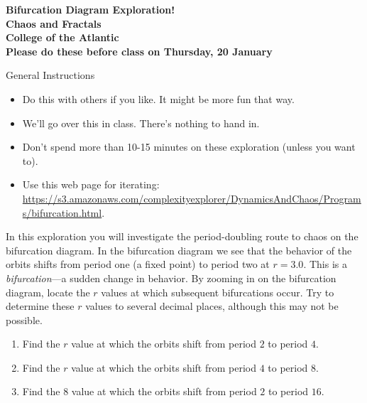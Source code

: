 \documentclass[12pt]{article}
\begin{document}
\pagestyle{empty}
 
\begin{center}
{\LARGE {\bf Bifurcation Diagram Exploration!}}\\
\bigskip
{\Large {\bf Chaos and Fractals}}\\
\bigskip
{\Large {\bf College of the Atlantic}}\\
\bigskip
    {{\bf Please do these before class on Thursday, 20 January}}\\
\end{center}
\medskip

\noindent General Instructions

\begin{itemize}
\setlength{\itemsep}{0mm}
\item Do this with others if you like. It might be more fun that
  way.
\item We'll go over this in class. There's nothing to hand in. 
\item Don't spend more than 10-15 minutes on these exploration (unless
  you want to).
  \item Use this web page for iterating:
    \href{https://s3.amazonaws.com/complexityexplorer/DynamicsAndChaos/Programs/bifurcation.html}{\url{https://s3.amazonaws.com/complexityexplorer/DynamicsAndChaos/Programs/bifurcation.html}}.    
\end{itemize}


\noindent In this exploration you will investigate the period-doubling
route to chaos on the bifurcation diagram.  In the bifurcation diagram
we see that the behavior of the orbits shifts from period one (a fixed
point) to period two at $r=3.0$. This is a \emph{bifurcation}---a
sudden change in behavior.
By zooming in on the bifurcation diagram, locate
the $r$ values at which subsequent bifurcations occur. Try to determine
these $r$ values to several decimal places, although this may not be
possible.  

\begin{enumerate}

  \item Find the $r$ value at which the orbits shift from period $2$
    to period $4$.
  \item Find the $r$ value at which the orbits shift from period $4$
    to period $8$.
  \item Find the $8$ value at which the orbits shift from period $2$
    to period $16$.  
\end{enumerate}
\end{document}
